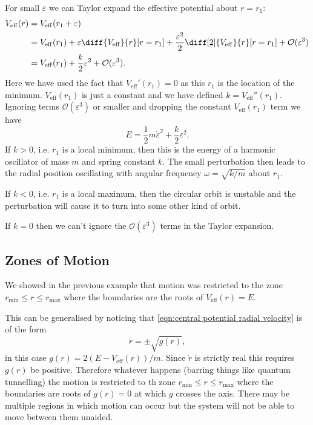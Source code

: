 \documentclass[fleqn]{NotesClass}
\newcommand*{\eff}{\mathrm{eff}}
\newcommand*{\order}{\mathcal{O}}
\begin{document}
    For small \(\varepsilon\) we can Taylor expand the effective potential about \(r = r_1\):
    \begin{align}
        V_\eff(r) &= V_{\eff}(r_1 + \varepsilon)\\
        &= V_\eff(r_1) + \varepsilon\diff{V_{\eff}}{r}[r=r_1] + \frac{\varepsilon^2}{2}\diff[2]{V_{\eff}}{r}[r=r_1] + \order(\varepsilon^3)\\
        &= V_\eff(r_1) + \frac{k}{2}\varepsilon^2 + \order(\varepsilon^3).
    \end{align}
    Here we have used the fact that \(V_\eff'(r_1) = 0\) as this \(r_1\) is the location of the minimum.
    \(V_\eff(r_1)\) is just a constant and we have defined \(k = V_\eff''(r_1)\).
    Ignoring terms \(\order(\varepsilon^3)\) or smaller and dropping the constant \(V_{\eff}(r_1)\) term we have
    \begin{equation}
        E = \frac{1}{2}m\dot{\varepsilon}^2 + \frac{k}{2}\varepsilon^2.
    \end{equation}
    If \(k > 0\), i.e. \(r_1\) is a local minimum, then this is the energy of a harmonic oscillator of mass \(m\) and spring constant \(k\).
    The small perturbation then leads to the radial position oscillating with angular frequency \(\omega = \sqrt{k/m}\) about \(r_1\).
    
    If \(k < 0\), i.e. \(r_1\) is a local maximum, then the circular orbit is unstable and the perturbation will cause it to turn into some other kind of orbit.
    
    If \(k = 0\) then we can't ignore the \(\order(\varepsilon^3)\) terms in the Taylor expansion.
    
    \subsection{Zones of Motion}
    We showed in the previous example that motion was restricted to the zone \(r_{\mathrm{min}} \le r \le r_{\mathrm{max}}\) where the boundaries are the roots of \(V_{\eff}(r) = E\).
    
    This can be generalised by noticing that \cref{eqn:central potential radial velocity} is of the form
    \begin{equation}
        \dot{r} = \pm \sqrt{g(r)},
    \end{equation}
    in this case \(g(r) = 2(E - V_{\eff}(r))/m\).
    Since \(\dot{r}\) is strictly real this requires \(g(r)\) be positive.
    Therefore whatever happens (barring things like quantum tunnelling) the motion is restricted to th zone \(r_{\mathrm{min}} \le r \le r_{\mathrm{max}}\) where the boundaries are roots of \(g(r) = 0\) at which \(g\) crosses the axis.
    There may be multiple regions in which motion can occur but the system will not be able to move between them unaided.
    
\end{document}
